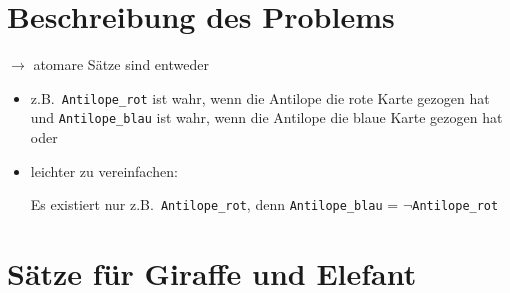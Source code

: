 \documentclass[a4paper,draft=false,oneside,12pt,ngerman]{scrreprt}
\begin{document}
\section{Beschreibung des Problems}
\label{sec:beschreibung_des_problems}

$\rightarrow$ atomare Sätze sind entweder
\begin{itemize}
    \item z.B.\ \verb+Antilope_rot+ ist wahr, wenn die Antilope die rote Karte gezogen hat und
        \verb+Antilope_blau+ ist wahr, wenn die Antilope die blaue Karte gezogen
        hat oder
    \item leichter zu vereinfachen:
        
        Es existiert nur z.B.\ \verb+Antilope_rot+,
        denn \verb+Antilope_blau+ = $ \neg $\verb+Antilope_rot+
\end{itemize}

\section{Sätze für Giraffe und Elefant}
\label{sec:saetze_fuer_giraffe_und_elefant}
\end{document}
